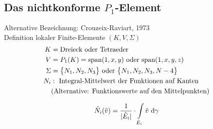 \subsection{Das nichtkonforme $P_1$-Element}
Alternative Bezeichnung: Crouzeix-Raviart, 1973\\
Definition lokaler Finite-Elemente $(K,V,\Sigma)$
\begin{align*}
K&=\text{Dreieck oder Tetraeder}\\
V&=P_1(K)=\text{span}(1,x,y)\text{ oder }\text{span}(1,x,y,z)\\
\Sigma&=\big\lbrace N_1,N_2,N_3\big\rbrace\text{ oder }\big\lbrace N_1,N_2,N_3,N-4\big\rbrace\\
N_i&:\text{ Integral-Mittelwert der Funktionen auf Kanten}\\
&\text{(Alternative: Funktionswerte auf den Mittelpunkten)}
\end{align*}

\begin{beisp}
\begin{align*}
\hat{N}_i(\hat{v})=\frac{1}{|\hat{E}_i|}\cdot\int\limits_{\hat{E}_i}\hat{v}\text{ d}\gamma
\end{align*}
\end{beisp}

